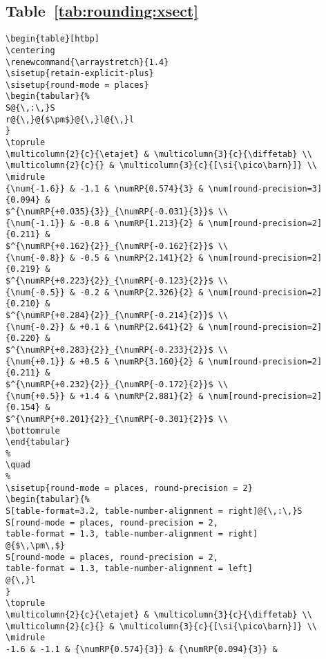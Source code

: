 \documentclass[UKenglish]{style/atlasdoc}
\newcommand*{\numRP}[2]{\num[round-mode=places, round-precision=#2]{#1}}
\newcommand*{\dif}{\text{d}}
\newcommand*{\etajet}{\ensuremath{\eta_{\text{jet}}}\xspace}
\newcommand*{\diffetab}{\ensuremath{\dif\sigma^{b} / \dif\eta^{b}}\xspace}
\begin{document}
\subsection{Table~\protect\ref{tab:rounding:xsect}}
\begin{verbatim}
\begin{table}[htbp]
\centering
\renewcommand{\arraystretch}{1.4}
\sisetup{retain-explicit-plus}
\sisetup{round-mode = places}
\begin{tabular}{%
S@{\,:\,}S
r@{\,}@{$\pm$}@{\,}l@{\,}l
}
\toprule
\multicolumn{2}{c}{\etajet} & \multicolumn{3}{c}{\diffetab} \\
\multicolumn{2}{c}{} & \multicolumn{3}{c}{[\si{\pico\barn}]} \\
\midrule
{\num{-1.6}} & -1.1 & \numRP{0.574}{3} & \num[round-precision=3]{0.094} & 
$^{\numRP{+0.035}{3}}_{\numRP{-0.031}{3}}$ \\
{\num{-1.1}} & -0.8 & \numRP{1.213}{2} & \num[round-precision=2]{0.211} & 
$^{\numRP{+0.162}{2}}_{\numRP{-0.162}{2}}$ \\
{\num{-0.8}} & -0.5 & \numRP{2.141}{2} & \num[round-precision=2]{0.219} & 
$^{\numRP{+0.223}{2}}_{\numRP{-0.123}{2}}$ \\
{\num{-0.5}} & -0.2 & \numRP{2.326}{2} & \num[round-precision=2]{0.210} & 
$^{\numRP{+0.284}{2}}_{\numRP{-0.214}{2}}$ \\
{\num{-0.2}} & +0.1 & \numRP{2.641}{2} & \num[round-precision=2]{0.220} & 
$^{\numRP{+0.283}{2}}_{\numRP{-0.233}{2}}$ \\
{\num{+0.1}} & +0.5 & \numRP{3.160}{2} & \num[round-precision=2]{0.211} & 
$^{\numRP{+0.232}{2}}_{\numRP{-0.172}{2}}$ \\
{\num{+0.5}} & +1.4 & \numRP{2.881}{2} & \num[round-precision=2]{0.154} & 
$^{\numRP{+0.201}{2}}_{\numRP{-0.301}{2}}$ \\
\bottomrule
\end{tabular}
%
\quad
%
\sisetup{round-mode = places, round-precision = 2}
\begin{tabular}{%
S[table-format=3.2, table-number-alignment = right]@{\,:\,}S
S[round-mode = places, round-precision = 2,
table-format = 1.3, table-number-alignment = right]
@{$\,\pm\,$}
S[round-mode = places, round-precision = 2,
table-format = 1.3, table-number-alignment = left]
@{\,}l
}
\toprule
\multicolumn{2}{c}{\etajet} & \multicolumn{3}{c}{\diffetab} \\
\multicolumn{2}{c}{} & \multicolumn{3}{c}{[\si{\pico\barn}]} \\
\midrule
-1.6 & -1.1 & {\numRP{0.574}{3}} & {\numRP{0.094}{3}} & 

\end{verbatim}
\end{document}

